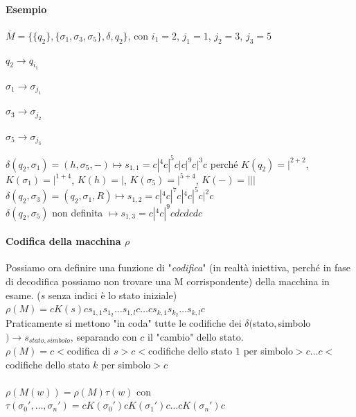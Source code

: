 \documentclass[10pt]{book}
\begin{document}
\paragraph{Esempio} $\overline{M} = \{\{q_2\}, \{\sigma_1, \sigma_3, \sigma_5\}, \delta, q_2\}$, con $i_1 = 2$, $j_1 = 1$, $j_2 = 3$, $j_3 = 5$
\begin{list}{}{}
	\item $q_2 \rightarrow q_{i_1}$
	\item $\sigma_1 \rightarrow \sigma_{j_1}$
	\item $\sigma_3 \rightarrow \sigma_{j_2}$
	\item $\sigma_5 \rightarrow \sigma_{j_3}$
\end{list}
$\delta(q_2, \sigma_1) = (h, \sigma_5, -) \mapsto s_{1, 1} = c|^4c|^5c|c|^9c|^3c$ perché $K(q_2) = |^{2 + 2}$, $K(\sigma_1) = |^{1 + 4}$, $K(h) = |$, $K(\sigma_5) = |^{5 + 4}$, $K(-) = |||$ \\
$\delta(q_2, \sigma_3) = (q_2, \sigma_1, R) \mapsto s_{1, 2} = c|^4c|^7c|^4c|^5c|^2c$\\
$\delta(q_2, \sigma_5)$ non definita $\mapsto s_{1, 3} = c|^4c|^9cdcdcdc$
\paragraph{Codifica della macchina $\rho$} Possiamo ora definire una funzione di "\textit{codifica}" (in realtà iniettiva, perché in fase di decodifica possiamo non trovare una M corrispondente) della macchina in esame. ($s$ senza indici è lo stato iniziale)\\
$\rho(M) = cK(s)cs_{1,1}s_{1_2}\ldots s_{1,l}c\ldots cs_{k,1}s_{k_2}\ldots s_{k,l}c$\\
Praticamente si mettono "in coda" tutte le codifiche dei $\delta($stato$, $simbolo$) \rightarrow s_{stato, simbolo}$, separando con $c$ il "cambio" dello stato.\\
$\rho(M) = c <$codifica di $s>c<$codifiche dello stato $1$ per simbolo$>c\ldots c<$codifiche dello stato $k$ per simbolo$>c$\\\\
$\rho(M(w)) = \rho(M)\tau(w)$ con $\tau(\sigma_0', \ldots, \sigma_n') = cK(\sigma_0')cK(\sigma_1')c\ldots cK(\sigma_n')c$
\end{document}
